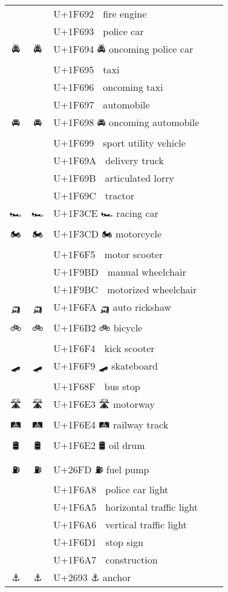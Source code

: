 \documentclass[a4paper,12pt]{ltjarticle}
\newcommand{\fontA}[1]{{\fontspec[RawFeature={mode=harf,+dist,+ccmp}]{Segoe UI Emoji} #1}}
\newcommand{\fontB}[1]{{\fontspec[RawFeature={mode=harf,+dist,+ccmp}]{Noto Color Emoji} #1}}
\begin{document}
\begin{longtable}[c]{ccp{0.8\linewidth}}
\fontA{🚒}&\fontB{🚒}&U+1F692 🚒 fire engine\\
\fontA{🚓}&\fontB{🚓}&U+1F693 🚓 police car\\
\fontA{🚔}&\fontB{🚔}&U+1F694 🚔 oncoming police car\\
\fontA{🚕}&\fontB{🚕}&U+1F695 🚕 taxi\\
\fontA{🚖}&\fontB{🚖}&U+1F696 🚖 oncoming taxi\\
\fontA{🚗}&\fontB{🚗}&U+1F697 🚗 automobile\\
\fontA{🚘}&\fontB{🚘}&U+1F698 🚘 oncoming automobile\\
\fontA{🚙}&\fontB{🚙}&U+1F699 🚙 sport utility vehicle\\
\fontA{🚚}&\fontB{🚚}&U+1F69A 🚚 delivery truck\\
\fontA{🚛}&\fontB{🚛}&U+1F69B 🚛 articulated lorry\\
\fontA{🚜}&\fontB{🚜}&U+1F69C 🚜 tractor\\
\fontA{🏎}&\fontB{🏎}&U+1F3CE 🏎 racing car\\
\fontA{🏍}&\fontB{🏍}&U+1F3CD 🏍 motorcycle\\
\fontA{🛵}&\fontB{🛵}&U+1F6F5 🛵 motor scooter\\
\fontA{🦽}&\fontB{🦽}&U+1F9BD 🦽 manual wheelchair\\
\fontA{🦼}&\fontB{🦼}&U+1F9BC 🦼 motorized wheelchair\\
\fontA{🛺}&\fontB{🛺}&U+1F6FA 🛺 auto rickshaw\\
\fontA{🚲}&\fontB{🚲}&U+1F6B2 🚲 bicycle\\
\fontA{🛴}&\fontB{🛴}&U+1F6F4 🛴 kick scooter\\
\fontA{🛹}&\fontB{🛹}&U+1F6F9 🛹 skateboard\\
\fontA{🚏}&\fontB{🚏}&U+1F68F 🚏 bus stop\\
\fontA{🛣}&\fontB{🛣}&U+1F6E3 🛣 motorway\\
\fontA{🛤}&\fontB{🛤}&U+1F6E4 🛤 railway track\\
\fontA{🛢}&\fontB{🛢}&U+1F6E2 🛢 oil drum\\
\fontA{⛽}&\fontB{⛽}&U+26FD ⛽ fuel pump\\
\fontA{🚨}&\fontB{🚨}&U+1F6A8 🚨 police car light\\
\fontA{🚥}&\fontB{🚥}&U+1F6A5 🚥 horizontal traffic light\\
\fontA{🚦}&\fontB{🚦}&U+1F6A6 🚦 vertical traffic light\\
\fontA{🛑}&\fontB{🛑}&U+1F6D1 🛑 stop sign\\
\fontA{🚧}&\fontB{🚧}&U+1F6A7 🚧 construction\\
\fontA{⚓}&\fontB{⚓}&U+2693 ⚓ anchor\\

\end{longtable}
\end{document}
